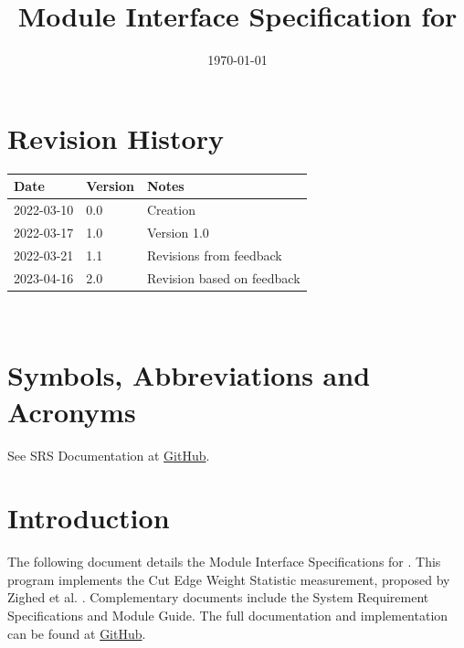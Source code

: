 \documentclass[12pt, titlepage]{article}
\begin{document}
\title{Module Interface Specification for \progname{}}

\author{\authname}

\date{\today}

\maketitle


\section{Revision History}

\begin{tabularx}{\textwidth}{p{3cm}p{2cm}X}
\toprule {\bf Date} & {\bf Version} & {\bf Notes}\\
\midrule
2022-03-10 & 0.0 & Creation \\
2022-03-17 & 1.0 & Version 1.0 \\
2022-03-21 & 1.1 & Revisions from feedback \\
2023-04-16 & 2.0 & Revision based on feedback \\
\bottomrule
\end{tabularx}

~\newpage

\section{Symbols, Abbreviations and Acronyms}

See SRS Documentation at \href{https://github.com/LesleyWheat/CAS741_CEWS/blob/main/docs/SRS/SRS.pdf}{GitHub}.


\newpage

\tableofcontents

\newpage


\section{Introduction}

The following document details the Module Interface Specifications for \progname{}.
This program implements the Cut Edge Weight Statistic measurement, proposed by Zighed et al. \cite{zighed_statistical_2005}. 
Complementary documents include the System Requirement Specifications
and Module Guide.  The full documentation and implementation can be
found at \href{https://github.com/LesleyWheat/CAS741_CEWS}{GitHub}.
\end{document}
